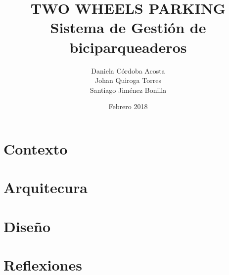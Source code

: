 \documentclass[openany,12pts,letterpaper,oneside,onecolumn]{book}
\begin{document}
\author{  Daniela Córdoba Acosta\\
	Johan Quiroga Torres\\
	Santiago Jiménez Bonilla
}
\title{	TWO WHEELS PARKING\\
	Sistema de Gestión de biciparqueaderos}

\date{Febrero 2018}

\frontmatter
\maketitle
\tableofcontents

\mainmatter

\part{Contexto}




\part{Arquitecura}








\part{Diseño}











\part{Reflexiones}




\backmatter


\end{document}
